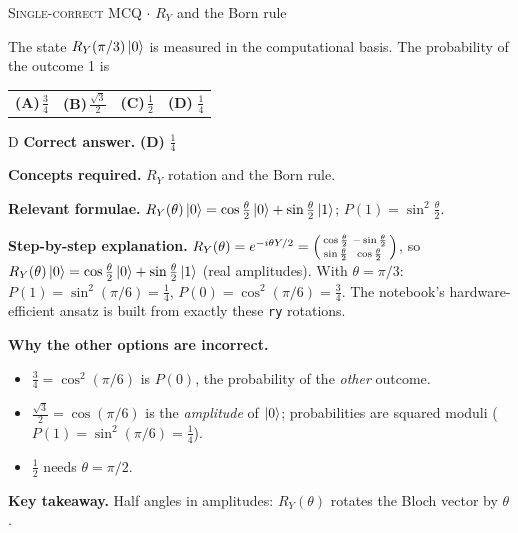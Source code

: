 \documentclass[11pt,a4paper]{article}
\newcommand{\optlabel}[1]{\textbf{(#1)}}
\newcommand{\correctlabel}[1]{\textcolor{okgreen}{\textbf{(#1)}\,\ding{51}}}
\newenvironment{qitem}[1]{\begin{list}{}{\setlength{\leftmargin}{3.3em}\setlength{\labelwidth}{3.1em}%
  \setlength{\labelsep}{0.2em}\setlength{\topsep}{3pt}\setlength{\parsep}{3pt}}\item[\textbf{Q.#1}\hfill]}{\end{list}}
\newcommand{\qsep}{\par\vspace{2pt}{\color{black!15}\hrule}\vspace{4pt}}
\newcommand{\qmeta}[2]{{\footnotesize\color{black!60}\textsc{#1} \;$\cdot$\; #2}\par}
\begin{document}
\begin{qitem}{21}
\qmeta{Single-correct MCQ}{$R_Y$ and the Born rule}
The state $R_Y(\pi/3)\ket0$ is measured in the computational basis. The probability of the outcome 1 is
\par\smallskip\noindent\begin{tabularx}{\linewidth}{@{}*{4}{L}@{}}
\optlabel{A}\,$\tfrac34$ & \optlabel{B}\,$\tfrac{\sqrt3}{2}$ & \optlabel{C}\,$\tfrac12$ & \correctlabel{D}\,$\tfrac14$
\end{tabularx}
\end{qitem}
\begin{solbox}{D}
\textbf{\color{brand}Correct answer.} \textcolor{okgreen}{\textbf{(D)}} $\tfrac14$

\textbf{\color{brand}Concepts required.} $R_Y$ rotation and the Born rule.

\textbf{\color{brand}Relevant formulae.} $R_Y(\theta)\ket0 = \cos\frac\theta2\ket0 + \sin\frac\theta2\ket1$; $P(1) = \sin^2\frac\theta2$.

\textbf{\color{brand}Step-by-step explanation.} $R_Y(\theta) = e^{-i\theta Y/2} = \begin{psmallmatrix}\cos\frac\theta2 & -\sin\frac\theta2\\ \sin\frac\theta2 & \cos\frac\theta2\end{psmallmatrix}$, so $R_Y(\theta)\ket0 = \cos\frac\theta2\ket0 + \sin\frac\theta2\ket1$
(real amplitudes). With $\theta = \pi/3$: $P(1) = \sin^2(\pi/6) = \tfrac14$, $P(0) = \cos^2(\pi/6) = \tfrac34$. The notebook's hardware-efficient
ansatz is built from exactly these \texttt{ry} rotations.

\textbf{\color{brand}Why the other options are incorrect.}
\begin{itemize}[leftmargin=2.4em, itemsep=1pt, topsep=2pt]
\item[\textbf{(A)}] $\frac34 = \cos^2(\pi/6)$ is $P(0)$, the probability of the \emph{other} outcome.
\item[\textbf{(B)}] $\frac{\sqrt3}{2} = \cos(\pi/6)$ is the \emph{amplitude} of $\ket0$; probabilities are squared moduli ($P(1) = \sin^2(\pi/6) = \frac14$).
\item[\textbf{(C)}] $\frac12$ needs $\theta = \pi/2$.
\end{itemize}
\textbf{\color{brand}Key takeaway.} Half angles in amplitudes: $R_Y(\theta)$ rotates the Bloch vector by $\theta$.
\end{solbox}
\qsep
\end{document}
